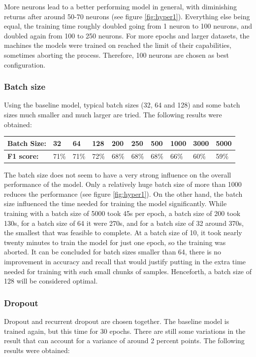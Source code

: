 \documentclass[
a4paper,
pagesize,
pdftex,
12pt,
twoside, %
BCOR=5mm, %
ngerman,
fleqn,
final,
]{scrartcl}
\begin{document}
	More neurons lead to a better performing model in general, with diminishing returns after around 50-70 neurons (see figure \ref{fig:hyper1}). Everything else being equal, the training time roughly doubled going from 1 neuron to 100 neurons, and doubled again from 100 to 250 neurons. For more epochs and larger datasets, the machines the models were trained on reached the limit of their capabilities, sometimes aborting the process. Therefore, 100 neurons are chosen as best configuration.
	
	\subsubsection{Batch size}
	Using the baseline model, typical batch sizes (32, 64 and 128) and some batch sizes much smaller and much larger are tried. The following results were obtained: 
	
	\begin{tabular} { | p{3cm} || p{0.8cm} | p{0.8cm}  | p{0.8cm}  |p{0.8cm} | p{0.8cm} | p{0.8cm} | p{0.8cm} | p{0.8cm}| p{0.8cm} |}
		\hline
		\textbf{Batch Size:}  &  32 & 64 & 128 & 200 & 250 & 500 & 1000 & 3000 &5000\\   
		\hline
		\textbf{F1 score:} & 71\% & 71\% & 72\% & 68\% & 68\% & 68\% & 66\% & 60\% & 59\%\\
		\hline
		\hline
	\end{tabular}
	
	The batch size does not seem to have a very strong influence on the overall performance of the model. Only a relatively huge batch size of more than 1000 reduces the performance (see figure \ref{fig:hyper1}). On the other hand, the batch size influenced the time needed for training the model significantly. While training with a batch size of 5000 took 45s per epoch, a batch size of 200 took 130s, for a batch size of 64 it were 270s, and for a batch size of 32 around 370s, the smallest that was feasible to complete. At a batch size of 10, it took nearly twenty minutes to train the model for just one epoch, so the training was aborted. It can be concluded for batch sizes smaller than 64, there is no improvement in accuracy and recall that would justify putting in the extra time needed for training with such small chunks of samples. Henceforth, a batch size of 128 will be considered optimal.

	\subsubsection{Dropout}
	Dropout and recurrent dropout are chosen together. The baseline model is trained again, but this time for 30 epochs. There are still some variations in the result that can account for a variance of around 2 percent points. The following results were obtained:
	
\end{document}
